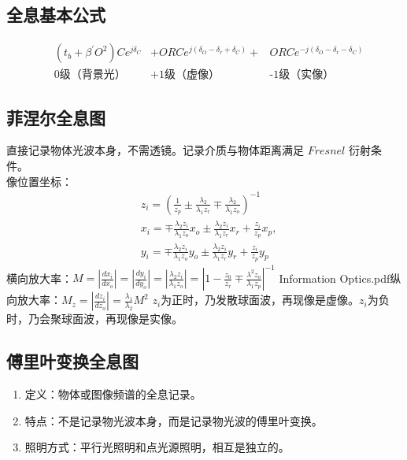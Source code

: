 \documentclass[twocolumn]{ctexart}
\begin{document}
\subsection{全息基本公式}
\begin{equation}
    \begin{aligned}
        &\left(t_b+\beta ^\prime O^2\right)Ce^{j\delta _C}&+ORCe^{j\left(\delta _O-\delta _r +\delta _C\right)}+&ORCe^{-j\left(\delta _O - \delta _r - \delta _C\right)}\\
       &\text{0级（背景光）}    &\text{+1级（虚像）}    &\text{-1级（实像）}
    \end{aligned}
    \nonumber
\end{equation}
\subsection{菲涅尔全息图}
直接记录物体光波本身，不需透镜。记录介质与物体距离满足 $Fresnel$ 衍射条件。\\
像位置坐标：
\begin{equation}
    \begin{aligned}
        &z_i=\left(\frac{1}{z_p}\pm \frac{\lambda _2}{\lambda _1 z_r}\mp \frac{\lambda_2}{\lambda_1z_o}\right)^{-1}\\
        &x_i=\mp\frac{\lambda _2 z_i}{\lambda _1 z_o}x_o \pm \frac{\lambda _2 z_i}{\lambda _1 z_r}x_r+\frac{z_i}{z_p}x_p,\\
        &y_i=\mp\frac{\lambda _2 z_i}{\lambda _1 z_o}y_o \pm \frac{\lambda _2 z_i}{\lambda _1 z_r}y_r+\frac{z_i}{z_p}y_p
    \end{aligned}
    \nonumber
\end{equation}
横向放大率：$M=\left\lvert \frac{dx_i}{dx_o}\right\lvert =\left\lvert \frac{dy_i}{dy_o}\right\lvert=\left\lvert \frac{\lambda _2 z_i}{\lambda _1 z_o}\right\lvert=\left\lvert 1-\frac{z_0}{z_r}\mp \frac{\lambda ^2 z_o}{\lambda _1 z_p}\right\lvert ^{-1}$
Information Optics.pdf纵向放大率：$M_z=\left\lvert \frac{dz_i}{dz_o}\right\lvert=\frac{\lambda _1}{\lambda _2}M^2$
$z_i$为正时，乃发散球面波，再现像是虚像。$z_i$为负时，乃会聚球面波，再现像是实像。
\subsection{傅里叶变换全息图}
\begin{enumerate}
    \item 定义：物体或图像频谱的全息记录。
    \item 特点：不是记录物光波本身，而是记录物光波的傅里叶变换。
    \item 照明方式：平行光照明和点光源照明，相互是独立的。
\end{enumerate}
\end{document}

